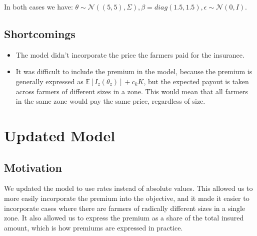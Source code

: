 \documentclass[11pt]{article}
\begin{document}
    In both cases we have: $\theta \sim \mathcal{N}((5,5),\Sigma), \beta = diag(1.5,1.5), \epsilon \sim \mathcal{N}(0,I)$.

  \subsection{Shortcomings}
  \begin{itemize}
      \item The model didn't incorporate the price the farmers paid for the insurance. 
      \item It was difficult to include the premium in the model, because the premium is generally expressed as $\mathbb{E}[I_z(\theta_z)] + c_k K$, but the expected payout is taken across farmers of different sizes in a zone. This would mean that all farmers in the same zone would pay the same price, regardless of size. 
  \end{itemize}

\section{Updated Model}
  \subsection{Motivation}
  We updated the model to use rates instead of absolute values. This allowed us to more easily incorporate the premium into the objective, and it made it easier to incorporate cases where there are farmers of radically different sizes in a single zone. It also allowed us to express the premium as a share of the total insured amount, which is how premiums are expressed in practice. 
\end{document}
